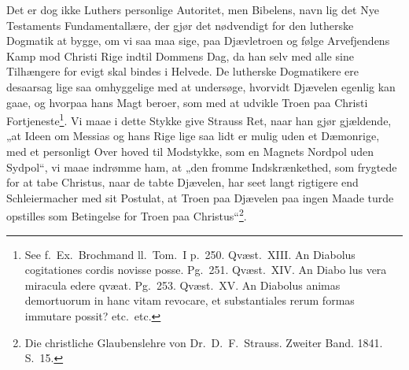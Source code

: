 \documentclass[12pt,a4paper]{article}
\newcommand{\opage}[1]{\marginnote{\footnotesize\textit{[#1]}}}
\begin{document}
Det er dog ikke Luthers personlige Autoritet, men Bibelens, navn\-%
lig det Nye Testaments Fundamentallære, der gjør det nødvendigt
for den lutherske Dogmatik at bygge, om vi saa maa sige, paa
Djævletroen og følge Arvefjendens Kamp mod Christi Rige indtil
Dommens Dag, da han selv med alle sine Tilhængere for evigt
skal bindes i Helvede. De lutherske Dogmatikere ere desaarsag
lige saa omhyggelige med at undersøge, hvorvidt Djævelen egenlig
\opage{24}kan gaae, og hvorpaa hans Magt beroer, som med at udvikle Troen
paa Christi Fortjeneste\footnote{See f.\ Ex.\ Brochmand ll.\ Tom.\ I p.\ 250. Qvæst.\ XIII. An Diabolus
cogitationes cordis novisse posse. Pg.\ 251. Qvæst.\ XIV. An Diabo\-%
lus vera miracula edere qvæat. Pg.\ 253. Qvæst.\ XV. An Diabolus
animas demortuorum in hanc vitam revocare, et substantiales rerum
formas immutare possit? etc.\ etc.}. %
Vi maae i dette Stykke give Strauss
Ret, naar han gjør gjældende, „at Ideen om Messias og hans Rige
lige saa lidt er mulig uden et Dæmonrige, med et personligt Over\-%
hoved til Modstykke, som en Magnets Nordpol uden Sydpol“, vi
maae indrømme ham, at „den fromme Indskrænkethed, som
frygtede for at tabe Christus, naar de tabte Djævelen, har seet
langt rigtigere end Schleiermacher med sit Postulat, at Troen paa
Djævelen paa ingen Maade turde opstilles som Betingelse for Troen
paa Christus“\footnote{Die christliche Glaubenslehre von Dr.\ D.\ F.\ Strauss. Zweiter Band.
1841. S.\ 15.}. %
\end{document}
